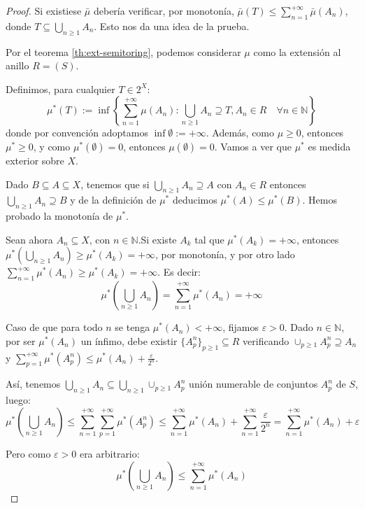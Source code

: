   \begin{proof}
   Si existiese $\bar{\mu}$ debería verificar, por monotonía, $\bar{\mu}(T) \le \sum_{n=1}^{+\infty} \bar{\mu}(A_n)$, 
   donde $T \subseteq \bigcup_{n\ge 1} A_n$. Esto nos da una idea de la prueba.
   
   Por el teorema \ref{th:ext-semitoring}, podemos considerar $\mu$ como la extensión al anillo $R=(S)$.
   
   Definimos, para cualquier $T\in 2^X$:
   \[
     \mu^\ast(T):= \inf\left\{\sum_{n=1}^{+\infty} \mu(A_n): \bigcup_{n\ge 1} A_n \supseteq T,
                   A_n\in R \quad \forall n\in\mathbb{N}\right\}
   \]
   donde por convención adoptamos $\inf \emptyset := +\infty$.
   Además, como $\mu \ge 0$, entonces $\mu^\ast \ge 0$, y como $\mu^\ast(\emptyset) = 0$, entonces $\mu(\emptyset) = 0$.
   Vamos a ver que $\mu^\ast$ es medida exterior sobre $X$.
    
   Dado $B\subseteq A \subseteq X$, tenemos que si $\bigcup_{n\ge 1} A_n \supseteq A$ con $A_n\in R$
   entonces $\bigcup_{n\ge 1} A_n \supseteq B$ y de la definición de $\mu^\ast$ deducimos $\mu^\ast(A) \le \mu^\ast(B)$.
   Hemos probado la monotonía de $\mu^\ast$.
   
   Sean ahora $A_n \subseteq X$, con $n\in \mathbb{N}$.Si existe $A_k$ tal que $\mu^\ast(A_k) = +\infty$, entonces 
   $\mu^\ast\left(\bigcup_{n\ge 1} A_n\right) \ge \mu^\ast(A_k) = +\infty$, 
   por monotonía, y por otro lado $\sum_{n=1}^{+\infty} \mu^\ast(A_n) \ge \mu^\ast(A_k) = +\infty$. Es decir:
   \[\mu^\ast\left(\bigcup_{n\ge 1} A_n\right) = \sum_{n=1}^{+\infty} \mu^\ast(A_n) = +\infty\]
   
   Caso de que para todo $n$ se tenga $\mu^\ast(A_n) < +\infty$, fijamos $\varepsilon > 0$.
   Dado $n\in \mathbb{N}$, por ser $\mu^\ast(A_n)$ un ínfimo, debe existir $\{A_p^n\}_{p\ge 1}\subseteq R$
   verificando $\cup_{p\ge 1} A_p^n \supseteq A_n$ y $\sum_{p=1}^{+\infty} \mu^\ast(A_p^n) \le \mu^\ast(A_n) + \frac{\varepsilon}{2^n}$.
   
   Así, tenemos $\bigcup_{n\ge 1} A_n \subseteq \bigcup_{n\ge 1} \cup_{p\ge 1} A_p^n$ unión numerable
   de conjuntos $A_p^n$ de $S$, luego:
   \[
     \mu^\ast \left(\bigcup_{n\ge 1} A_n \right) \le \sum_{n=1}^{+\infty} \sum_{p=1}^{+\infty} \mu^\ast(A_p^n)
     \le \sum_{n=1}^{+\infty}\mu^\ast(A_n) + \sum_{n=1}^{+\infty}\frac{\varepsilon}{2^n} = 
     \sum_{n=1}^{+\infty}\mu^\ast(A_n) + \varepsilon
   \]
   
   Pero como $\varepsilon > 0$ era arbitrario: 
   \[
     \mu^\ast \left(\bigcup_{n\ge 1} A_n \right) \le \sum_{n=1}^{+\infty}\mu^\ast(A_n)
   \]
   

\end{proof}
